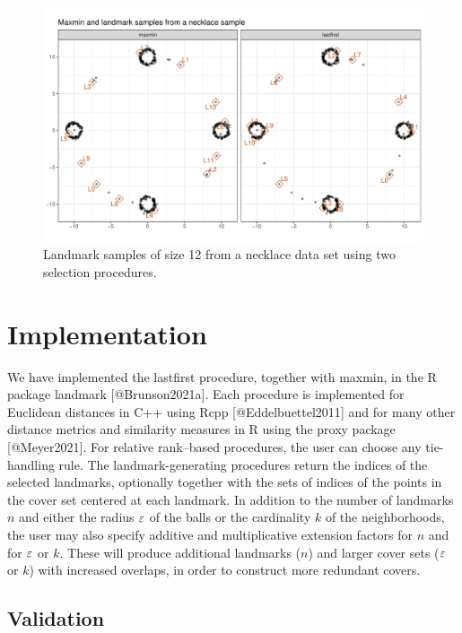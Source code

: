 \documentclass[
]{article}
\begin{document}
\begin{figure}
\includegraphics[width=\textwidth]{../figures/necklace-landmarks}
\caption{
Landmark samples of size 12 from a necklace data set using two selection procedures.
\label{fig:necklace}
}
\end{figure}

\hypertarget{implementation}{%
\section{Implementation}\label{implementation}}

\label{sec:implementation}

We have implemented the lastfirst procedure, together with maxmin, in
the R package landmark {[}@Brunson2021a{]}. Each procedure is
implemented for Euclidean distances in C++ using Rcpp
{[}@Eddelbuettel2011{]} and for many other distance metrics and
similarity measures in R using the proxy package {[}@Meyer2021{]}. For
relative rank--based procedures, the user can choose any tie-handling
rule. The landmark-generating procedures return the indices of the
selected landmarks, optionally together with the sets of indices of the
points in the cover set centered at each landmark. In addition to the
number of landmarks \(n\) and either the radius \(\varepsilon\) of the balls or
the cardinality \(k\) of the neighborhoods, the user may also specify
additive and multiplicative extension factors for \(n\) and for \(\varepsilon\)
or \(k\). These will produce additional landmarks (\(n\)) and larger
cover sets (\(\varepsilon\) or \(k\)) with increased overlaps, in order to
construct more redundant covers.

\hypertarget{validation}{%
\subsection{Validation}\label{validation}}
\end{document}
